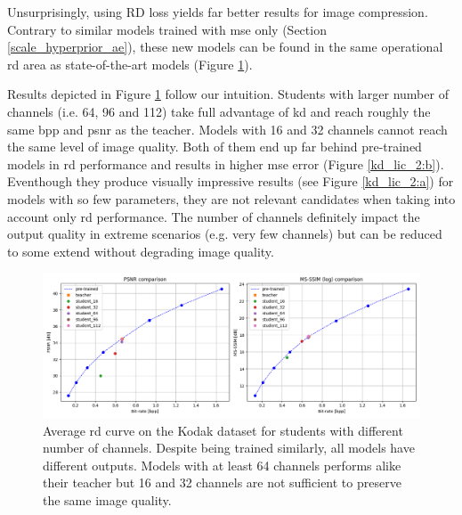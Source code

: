 Unsurprisingly, using \acrshort{RD} loss yields far better results for image compression. Contrary to similar models trained with \acrshort{mse} only (Section \ref{scale_hyperprior_ae}), these new models can be found in the same operational \acrshort{rd} area as state-of-the-art models (Figure \ref{kd_lic_1}).

Results depicted in Figure \ref{kd_lic_1} follow our intuition. Students with larger number of channels (i.e. 64, 96 and 112) take full advantage of \acrshort{kd} and reach roughly the same \acrshort{bpp} and \acrshort{psnr} as the teacher. Models with 16 and 32 channels cannot reach the same level of image quality. Both of them end up far behind pre-trained models in \acrshort{rd} performance and results in higher \acrshort{mse} error (Figure \ref{kd_lic_2:b}). Eventhough they produce visually impressive results (see Figure \ref{kd_lic_2:a}) for models with so few parameters, they are not relevant candidates when taking into account only \acrshort{rd} performance. The number of channels definitely impact the output quality in extreme scenarios (e.g. very few channels) but can be reduced to some extend without degrading image quality.

\begin{figure}
    \centering
    \includegraphics[width=15cm]{../img/kd_lic_rd_channels.png}
    \caption[Average \acrshort{rd} curve on the Kodak dataset for students with different number of channels.]{Average \acrshort{rd} curve on the Kodak dataset for students with different number of channels. Despite being trained similarly, all models have different outputs. Models with at least 64 channels performs alike their teacher but 16 and 32 channels are not sufficient to preserve the same image quality.}
    \label{kd_lic_1}
\end{figure}

